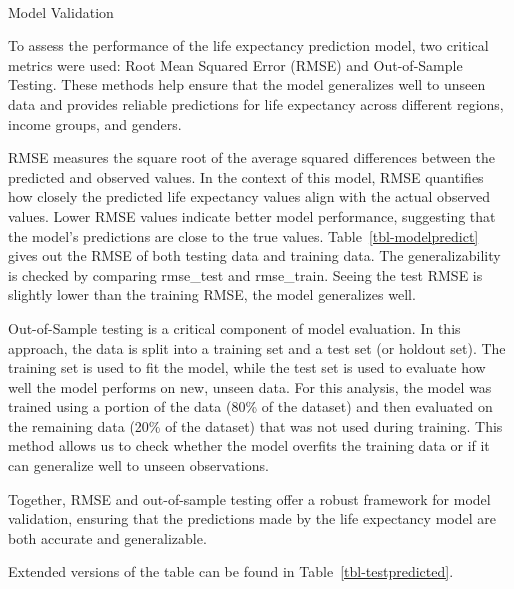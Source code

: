 \documentclass[
  letterpaper,
  DIV=11,
  numbers=noendperiod]{scrartcl}
\makeatletter
\let\oldparagraph\paragraph
\renewcommand{\paragraph}{
    \@ifstar
      \xxxParagraphStar
      \xxxParagraphNoStar
  }
\newcommand{\xxxParagraphStar}[1]{\oldparagraph*{#1}\mbox{}}
\newcommand{\xxxParagraphNoStar}[1]{\oldparagraph{#1}\mbox{}}
\makeatother
\begin{document}
\paragraph{Model Validation}\label{model-validation}

To assess the performance of the life expectancy prediction model, two
critical metrics were used: Root Mean Squared Error (RMSE) and
Out-of-Sample Testing. These methods help ensure that the model
generalizes well to unseen data and provides reliable predictions for
life expectancy across different regions, income groups, and genders.

RMSE measures the square root of the average squared differences between
the predicted and observed values. In the context of this model, RMSE
quantifies how closely the predicted life expectancy values align with
the actual observed values. Lower RMSE values indicate better model
performance, suggesting that the model's predictions are close to the
true values. Table~\ref{tbl-modelpredict} gives out the RMSE of both
testing data and training data. The generalizability is checked by
comparing rmse\_test and rmse\_train. Seeing the test RMSE is slightly
lower than the training RMSE, the model generalizes well.

Out-of-Sample testing is a critical component of model evaluation. In
this approach, the data is split into a training set and a test set (or
holdout set). The training set is used to fit the model, while the test
set is used to evaluate how well the model performs on new, unseen data.
For this analysis, the model was trained using a portion of the data
(80\% of the dataset) and then evaluated on the remaining data (20\% of
the dataset) that was not used during training. This method allows us to
check whether the model overfits the training data or if it can
generalize well to unseen observations.

Together, RMSE and out-of-sample testing offer a robust framework for
model validation, ensuring that the predictions made by the life
expectancy model are both accurate and generalizable.

Extended versions of the table can be found in
Table~\ref{tbl-testpredicted}.
\end{document}
